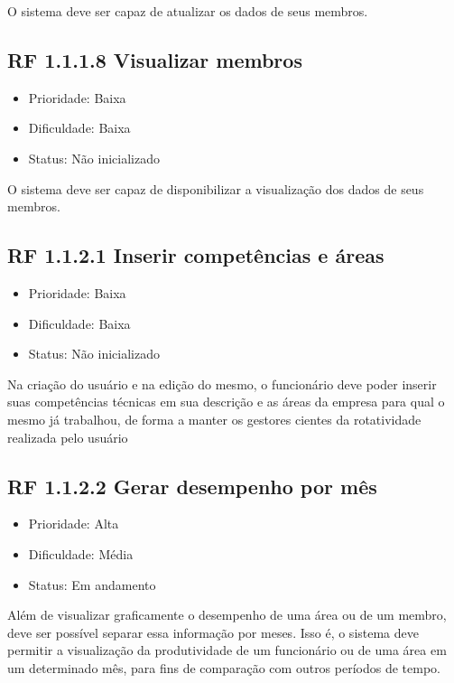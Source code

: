O sistema deve ser capaz de atualizar os dados de seus membros.



\subsection{RF 1.1.1.8 Visualizar membros}

\begin{itemize}
  \item{Prioridade: Baixa}
  \item{Dificuldade: Baixa}
  \item{Status: Não inicializado}
\end{itemize}

O sistema deve ser capaz de disponibilizar a visualização dos dados de seus membros.


\subsection{RF 1.1.2.1 Inserir competências e áreas}

\begin{itemize}
  \item{Prioridade: Baixa}
  \item{Dificuldade: Baixa}
  \item{Status: Não inicializado}
\end{itemize}

Na criação do usuário e na edição do mesmo, o funcionário deve poder inserir suas competências técnicas em sua descrição e as áreas da empresa para qual o mesmo já trabalhou, de forma a manter os gestores cientes da rotatividade realizada pelo usuário


\subsection{RF 1.1.2.2 Gerar desempenho por mês}

\begin{itemize}
  \item{Prioridade: Alta}
  \item{Dificuldade: Média}
  \item{Status: Em andamento}
\end{itemize}

Além de visualizar graficamente o desempenho de uma área ou de um membro, deve ser possível separar essa informação por meses. Isso é, o sistema deve permitir a visualização da produtividade de um funcionário ou de uma área em um determinado mês, para fins de comparação com outros períodos de tempo.


